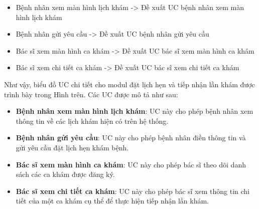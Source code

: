 \begin{itemize}[nosep,leftmargin=*]
  \item Bệnh nhân xem màn hình lịch khám -> Đề xuất UC bệnh nhân xem màn hình lịch khám
\end{itemize}

\begin{itemize}[nosep,leftmargin=*]
  \item Bệnh nhân gửi yêu cầu -> Đề xuất UC bệnh nhân gửi yêu cầu
\end{itemize}

\begin{itemize}[nosep,leftmargin=*]
  \item Bác sĩ xem màn hình ca khám -> Đề xuất UC bác sĩ xem màn hình ca khám
\end{itemize}

\begin{itemize}[nosep,leftmargin=*]
  \item Bác sĩ xem chi tiết ca khám -> Đề xuất UC bác sĩ xem chi tiết ca khám
\end{itemize}

Như vậy, biểu đồ UC chi tiết cho modul đặt lịch hẹn và tiếp nhận lần khám được trình bày trong Hình trên. Các UC được mô tả như sau:

\begin{itemize}[nosep,leftmargin=*]
  \item \textbf{Bệnh nhân xem màn hình lịch khám}: UC này cho phép bệnh nhân xem thông tin về các lịch khám hiện có trên hệ thống.
\end{itemize}

\begin{itemize}[nosep,leftmargin=*]
  \item \textbf{Bệnh nhân gửi yêu cầu}: UC này cho phép bệnh nhân điền thông tin và gửi yêu cầu đặt lịch hẹn khám bệnh.
\end{itemize}

\begin{itemize}[nosep,leftmargin=*]
  \item \textbf{Bác sĩ xem màn hình ca khám}: UC này cho phép bác sĩ theo dõi danh sách các ca khám được đăng ký.
\end{itemize}

\begin{itemize}[nosep,leftmargin=*]
  \item \textbf{Bác sĩ xem chi tiết ca khám}: UC này cho phép bác sĩ xem thông tin chi tiết của một ca khám cụ thể để thực hiện tiếp nhận lần khám.
\end{itemize}

